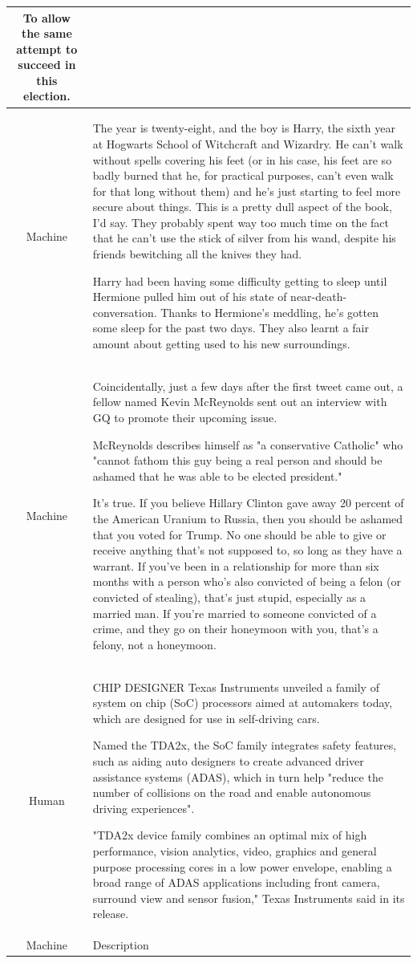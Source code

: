 \begin{table}[]
\begin{tabular}{c|p{5.5in}}
To allow the same attempt to succeed in this election.
\\
\hline
Machine
&
The year is twenty-eight, and the boy is Harry, the sixth year at Hogwarts School of Witchcraft and Wizardry. He can't walk without spells covering his feet (or in his case, his feet are so badly burned that he, for practical purposes, can't even walk for that long without them) and he's just starting to feel more secure about things. This is a pretty dull aspect of the book, I'd say. They probably spent way too much time on the fact that he can't use the stick of silver from his wand, despite his friends bewitching all the knives they had.

Harry had been having some difficulty getting to sleep until Hermione pulled him out of his state of near-death-conversation. Thanks to Hermione's meddling, he's gotten some sleep for the past two days. They also learnt a fair amount about getting used to his new surroundings.
\\
\hline
Machine
&
Coincidentally, just a few days after the first tweet came out, a fellow named Kevin McReynolds sent out an interview with GQ to promote their upcoming issue.

McReynolds describes himself as "a conservative Catholic" who "cannot fathom this guy being a real person and should be ashamed that he was able to be elected president."

It's true. If you believe Hillary Clinton gave away 20 percent of the American Uranium to Russia, then you should be ashamed that you voted for Trump. No one should be able to give or receive anything that's not supposed to, so long as they have a warrant. If you've been in a relationship for more than six months with a person who's also convicted of being a felon (or convicted of stealing), that's just stupid, especially as a married man. If you're married to someone convicted of a crime, and they go on their honeymoon with you, that's a felony, not a honeymoon.
\\
\hline
Human
&
CHIP DESIGNER Texas Instruments unveiled a family of system on chip (SoC) processors aimed at automakers today, which are designed for use in self-driving cars.

Named the TDA2x, the SoC family integrates safety features, such as aiding auto designers to create advanced driver assistance systems (ADAS), which in turn help "reduce the number of collisions on the road and enable autonomous driving experiences".

"TDA2x device family combines an optimal mix of high performance, vision analytics, video, graphics and general purpose processing cores in a low power envelope, enabling a broad range of ADAS applications including front camera, surround view and sensor fusion," Texas Instruments said in its release.
\\
\hline
Machine
&
Description


\end{tabular}
\end{table}
